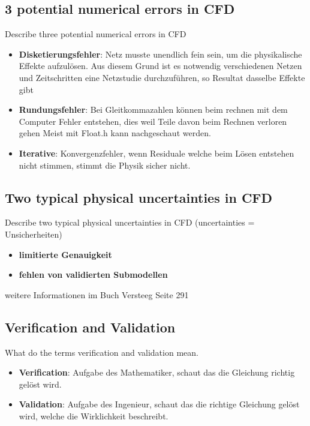 \documentclass[a4paper]{scrartcl}
\begin{document}
\subsection{3 potential numerical errors in CFD}

Describe three potential numerical errors in CFD
\begin{itemize}
\item \textbf{Disketierungsfehler}: Netz musste unendlich fein sein, um die physikalische Effekte aufzulösen. Aus diesem Grund ist es notwendig verschiedenen Netzen und Zeitschritten eine Netzstudie durchzuführen, so Resultat dasselbe Effekte gibt
\item \textbf{Rundungsfehler}: Bei Gleitkommazahlen können beim rechnen mit dem Computer Fehler entstehen, dies weil Teile davon beim Rechnen verloren  gehen Meist mit Float.h kann nachgeschaut werden.
\item \textbf{Iterative}: Konvergenzfehler, wenn Residuale welche beim Lösen entstehen nicht stimmen, stimmt die Physik sicher nicht.  
\end{itemize}

\subsection{Two typical physical uncertainties in CFD}
Describe two typical physical uncertainties in CFD (uncertainties =
Unsicherheiten)
\begin{itemize}
\item \textbf{limitierte Genauigkeit}
\item \textbf{fehlen von validierten Submodellen}
\end{itemize}
weitere Informationen im Buch Versteeg Seite 291

\subsection{Verification and Validation} 
What do the terms verification and
validation mean.
\begin{itemize}
\item \textbf{Verification}: Aufgabe des Mathematiker, schaut das die Gleichung richtig gelöst wird.
\item \textbf{Validation}: Aufgabe des Ingenieur, schaut das die richtige Gleichung gelöst wird, welche die Wirklichkeit beschreibt.
\end{itemize}
\end{document}
